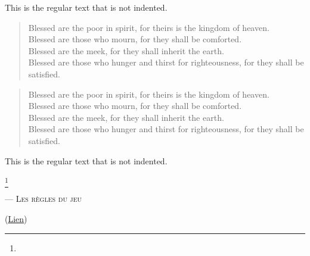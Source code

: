 \documentclass[twocolumn]{report}
\begin{document}
\noindent This is the regular text that is not indented.
\begin{verse}
Blessed are the poor in spirit, for theirs is the kingdom of heaven.\\
Blessed are those who mourn, for they shall be comforted.\\
Blessed are the meek, for they shall inherit the earth.\\
Blessed are those who hunger and thirst for righteousness, for they shall be satisfied.
\end{verse}
\setlength{\leftmargini}{\saveleftmargini}%

\begin{verse}
Blessed are the poor in spirit, for theirs is the kingdom of heaven.\\
Blessed are those who mourn, for they shall be comforted.\\
Blessed are the meek, for they shall inherit the earth.\\
Blessed are those who hunger and thirst for righteousness, for they shall be satisfied.
\end{verse}
\noindent This is the regular text that is not indented.

\bigskip
\makeatletter{}\makeatother %
\blindtext\footnote{\blindtext}

\fontname\font — \textsc{Les règles du jeu}\par
(\hyperref[utopie]{\underline{Lien}})\par
\noindent {}\blindtext\par
\noindent {}\blindtext\par
\noindent {}\blindtext\par
\noindent {}\blindtext\par
\noindent {}\blindtext\par

\label{utopie}


\blindtext
\end{document}
